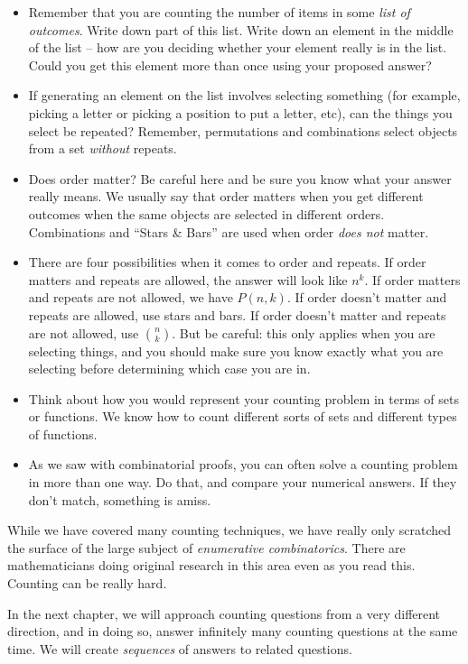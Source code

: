 \documentclass[12pt]{article}
\begin{document}
\begin{itemize}
\item Remember that you are counting the number of items in some \emph{list of outcomes}.  Write down part of this list.  Write down an element in the middle of the list -- how are you deciding whether your element really is in the list.  Could you get this element more than once using your proposed answer?
\item If generating an element on the list involves selecting something (for example, picking a letter or picking a position to put a letter, etc), can the things you select be repeated?  Remember, permutations and combinations select objects from a set \emph{without} repeats.
\item Does order matter?  Be careful here and be sure you know what your answer really means.  We usually say that order matters when you get different outcomes when the same objects are selected in different orders.  Combinations and ``Stars \& Bars'' are used when order {\em does not} matter.
\item There are four possibilities when it comes to order and repeats.  If order matters and repeats are allowed, the answer will look like $n^k$.  If order matters and repeats are not allowed, we have $P(n,k)$.  If order doesn't matter and repeats are allowed, use stars and bars.  If order doesn't matter and repeats are not allowed, use ${n\choose k}$.  But be careful: this only applies when you are selecting things, and you should make sure you know exactly what you are selecting before determining which case you are in.
\item Think about how you would represent your counting problem in terms of sets or functions.  We know how to count different sorts of sets and different types of functions.  %

\item As we saw with combinatorial proofs, you can often solve a counting problem in more than one way.  Do that, and compare your numerical answers.  If they don't match, something is amiss.
\end{itemize}

While we have covered many counting techniques, we have really only scratched the surface of the large subject of \emph{enumerative combinatorics}.  There are mathematicians doing original research in this area even as you read this.  Counting can be really hard.

In the next chapter, we will approach counting questions from a very different direction, and in doing so, answer infinitely many counting questions at the same time.  We will create \emph{sequences} of answers to related questions.
\end{document}
